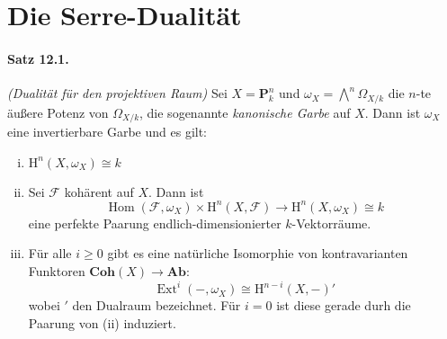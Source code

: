 \section{Die Serre-Dualität}

\paragraph{Satz 12.1.}\label{12.1} \textit{(Dualität für den projektiven Raum)} Sei $X=\mathbf{P}_k^n$ und $\omega_X=\bigwedge^n\Omega_{X/k}$ die $n$-te äußere Potenz von $\Omega_{X/k}$, die sogenannte \textit{kanonische Garbe} auf $X$. Dann ist $\omega_X$ eine invertierbare Garbe und es gilt:
\begin{enumerate}[(i)]
\item $\mathrm{H}^n(X,\omega_X)\cong k$
\item Sei $\mathcal{F}$ kohärent auf $X$. Dann ist
\[\operatorname{Hom}(\mathcal{F},\omega_X)\times\mathrm{H}^n(X,\mathcal{F})\to\mathrm{H}^n(X,\omega_X)\cong k \]
eine perfekte Paarung endlich-dimensionierter $k$-Vektorräume.
\item Für alle $i\geq 0$ gibt es eine natürliche Isomorphie von kontravarianten Funktoren $\mathbf{Coh}(X)\to\mathbf{Ab}$:
\[\operatorname{Ext}^i(-,\omega_X)\cong\mathrm{H}^{n-i}(X,-)' \]
wobei $'$ den Dualraum bezeichnet. Für $i=0$ ist diese gerade durh die Paarung von (ii) induziert.
\end{enumerate}

